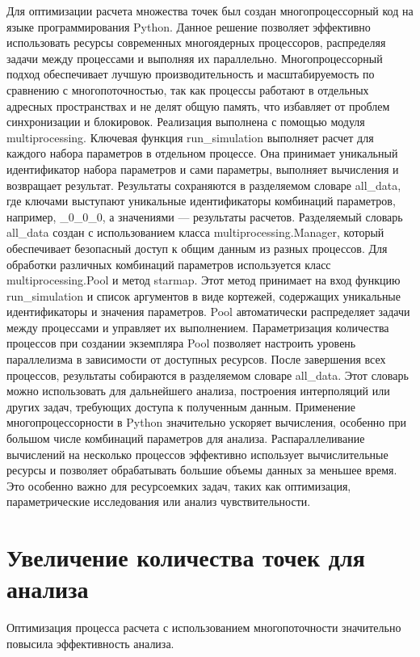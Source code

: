 \documentclass[a4paper,12pt]{extreport}
\numberwithin{equation}{chapter}
\begin{document}
Для оптимизации расчета множества точек был создан многопроцессорный код на языке программирования Python. 
Данное решение позволяет эффективно использовать ресурсы современных многоядерных процессоров, распределяя задачи между процессами и выполняя их параллельно.
Многопроцессорный подход обеспечивает лучшую производительность и масштабируемость по сравнению с многопоточностью, так как процессы работают в отдельных адресных пространствах и не делят общую память, что избавляет от проблем синхронизации и блокировок.
Реализация выполнена с помощью модуля multiprocessing. Ключевая функция run_simulation выполняет расчет для каждого набора параметров в отдельном процессе.
Она принимает уникальный идентификатор набора параметров и сами параметры, выполняет вычисления и возвращает результат.
Результаты сохраняются в разделяемом словаре all_data, где ключами выступают уникальные идентификаторы комбинаций параметров, например, _0_0_0, а значениями — результаты расчетов.
Разделяемый словарь all_data создан с использованием класса multiprocessing.Manager, который обеспечивает безопасный доступ к общим данным из разных процессов.
Для обработки различных комбинаций параметров используется класс multiprocessing.Pool и метод starmap. Этот метод принимает на вход функцию run_simulation и список аргументов в виде кортежей, содержащих уникальные идентификаторы и значения параметров.
Pool автоматически распределяет задачи между процессами и управляет их выполнением.
Параметризация количества процессов при создании экземпляра Pool позволяет настроить уровень параллелизма в зависимости от доступных ресурсов.
После завершения всех процессов, результаты собираются в разделяемом словаре all_data.
Этот словарь можно использовать для дальнейшего анализа, построения интерполяций или других задач, требующих доступа к полученным данным.
Применение многопроцессорности в Python значительно ускоряет вычисления, особенно при большом числе комбинаций параметров для анализа.
Распараллеливание вычислений на несколько процессов эффективно использует вычислительные ресурсы и позволяет обрабатывать большие объемы данных за меньшее время.
Это особенно важно для ресурсоемких задач, таких как оптимизация, параметрические исследования или анализ чувствительности.

\section{Увеличение количества точек для анализа}

Оптимизация процесса расчета с использованием многопоточности значительно повысила эффективность анализа.
\end{document}
